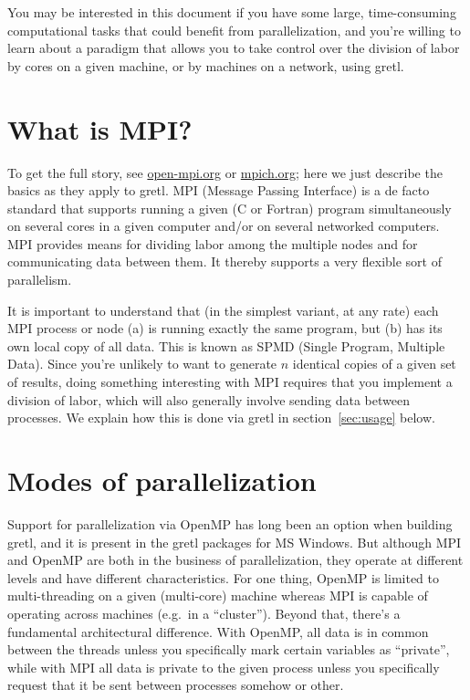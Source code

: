 \documentclass{article}
\begin{document}
You may be interested in this document if you have some large,
time-consuming computational tasks that could benefit from
parallelization, and you're willing to learn about a paradigm that
allows you to take control over the division of labor by cores on a
given machine, or by machines on a network, using gretl.

\section{What is MPI?}
\label{sec:MPI}

To get the full story, see \url{open-mpi.org} or \url{mpich.org}; here
we just describe the basics as they apply to gretl. MPI (Message
Passing Interface) is a de facto standard that supports running a
given (C or Fortran) program simultaneously on several cores in a
given computer and/or on several networked computers. MPI provides
means for dividing labor among the multiple nodes and for
communicating data between them. It thereby supports a very flexible
sort of parallelism.

It is important to understand that (in the simplest variant, at any
rate) each MPI process or node (a) is running exactly the same
program, but (b) has its own local copy of all data. This is known as
SPMD (Single Program, Multiple Data). Since you're unlikely to want to
generate $n$ identical copies of a given set of results, doing
something interesting with MPI requires that you implement a division
of labor, which will also generally involve sending data between
processes. We explain how this is done via gretl in
section~\ref{sec:usage} below.

\section{Modes of parallelization}
\label{sec:MPI-OMP}

Support for parallelization via \textsf{OpenMP} has long been an
option when building gretl, and it is present in the gretl packages
for MS Windows. But although MPI and \textsf{OpenMP} are both in the
business of parallelization, they operate at different levels and have
different characteristics. For one thing, \textsf{OpenMP} is limited
to multi-threading on a given (multi-core) machine whereas MPI is
capable of operating across machines (e.g.\ in a ``cluster''). Beyond
that, there's a fundamental architectural difference. With
\textsf{OpenMP}, all data is in common between the threads unless you
specifically mark certain variables as ``private'', while with MPI all
data is private to the given process unless you specifically request
that it be sent between processes somehow or other.
\end{document}
